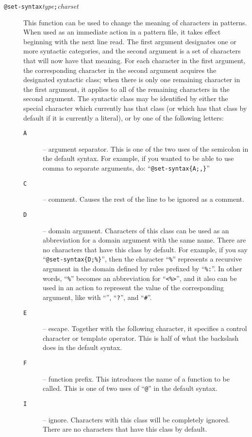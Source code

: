 \begin{description}
\item[{\tt @set-syntax\ttlb}{\it type}{\tt ;}{\it charset}{\tt \ttrb}]
This function can be used to change the meaning of characters in
patterns.  When used as an immediate action in a pattern file, it takes
effect beginning with the next line read.
The first argument designates one or more syntactic
categories, and the second argument is a set of characters that will now
have that meaning.  For each character in the first argument, the
corresponding character in the second argument acquires the designated
syntactic class; when there is only one remaining character in the first
argument, it applies to all of the remaining characters in the second
argument.  The syntactic class may be identified by either the special
character which currently has that class (or which has that class by
default if it is currently a literal), or by one of the following
letters:
  \begin{description}
    \item[\tt A] -- argument separator.  This is one of the two uses of
	the semicolon in the default syntax.  For example, if you wanted
	to be able to use comma to separate arguments, do:
	``\verb|@set-syntax{A;,}|''
    \item[\tt C] -- comment.  Causes the rest of the line to be ignored
	as a comment.
    \item[\tt D] -- domain argument.  Characters of this class can be
	used as an abbreviation for a domain argument with the same name.
	There are no characters that have this class by default.
	For example, if you say ``\verb/@set-syntax{D;%}/'', then the
	character  ``\verb/%/'' represents a recursive argument in the
	domain defined by rules prefixed by ``\verb/%:/''.  In other
	words,  ``\verb/%/'' becomes an abbreviation for ``\verb/<%>/'',
	and it also can be used in an action to represent the value of
	the corresponding argument, like with ``{\tt *}'',  ``{\tt ?}'',
	and ``\verb/#/''.
    \item[\tt E] -- escape.  Together with the following character, it
	specifies a control character or template operator.  This is half of
	what the backslash does in the default syntax.
    \item[\tt F] --  function prefix.  This introduces the name of a
	function to be called.  This is one of two uses of ``\verb/@/''
	in the default syntax.
    \item[\tt I] --  ignore.  Characters with this class will be
	completely ignored.  There are no characters that have this
	class by default.

\end{description}
\end{description}
